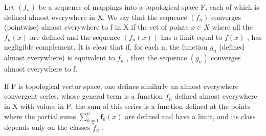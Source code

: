 Let \((f_n)\) be a sequence of mappings into a topological space F, each of which is defined almost everywhere in X. We say that the sequence \((f_n)\) converges (pointwise) almost everywhere to f in X if the set of points \(x \in X\) where all the \(f_n(x)\) are defined and the sequence \((f_n(x))\) has a limit equal to \(f(x)\) , has negligible complement. It is clear that if, for each n, the function \(g_n\) (defined almost everywhere) is equivalent to \(f_n\) , then the sequence \((g_n)\) converges almost everywhere to f.

If F is topological vector space, one defines similarly an almost everywhere convergent series, whose general term is a function \(f_{n}\) defined almost everywhere in X with values in F; the sum of this series is a function defined at the points where the partial sums \(\sum_{k=1}^{n}\mathbf{f}_{k}(x)\) are defined and have a limit, and its class depends only on the classes \(\widetilde{f}_{n}\) .

